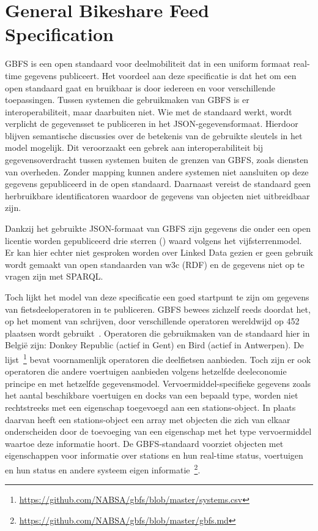 \section{General Bikeshare Feed Specification}
\label{sec:GBFS}
GBFS is een open standaard voor deelmobiliteit dat in een uniform formaat real-time gegevens publiceert. Het voordeel aan deze specificatie is dat het om een open standaard gaat en bruikbaar is door iedereen en voor verschillende toepassingen. Tussen systemen die gebruikmaken van GBFS is er interoperabiliteit, maar daarbuiten niet. Wie met de standaard werkt, wordt verplicht de gegevensset te publiceren in het JSON-gegevensformaat. Hierdoor blijven semantische discussies over de betekenis van de gebruikte sleutels in het model mogelijk. Dit veroorzaakt een gebrek aan interoperabiliteit bij gegevensoverdracht tussen systemen buiten de grenzen van GBFS, zoals diensten van overheden. Zonder mapping kunnen andere systemen niet aansluiten op deze gegevens gepubliceerd in de open standaard. Daarnaast vereist de standaard geen herbruikbare identificatoren waardoor de gegevens van objecten niet uitbreidbaar zijn. 

Dankzij het gebruikte JSON-formaat van GBFS zijn gegevens die onder een open licentie worden gepubliceerd drie sterren  (\ast \ast \ast) waard volgens het vijfsterrenmodel.
Er kan hier echter niet gesproken worden over Linked Data gezien
er geen gebruik wordt gemaakt van open standaarden van w3c (RDF) en de gegevens niet op te vragen zijn met SPARQL. 

Toch lijkt het model van deze specificatie een goed startpunt te zijn om gegevens van fietsdeeloperatoren in te publiceren. GBFS bewees zichzelf reeds doordat het, op het moment van schrijven,  door verschillende operatoren wereldwijd op 452 plaatsen wordt gebruikt~\cite{GBFS_systems}. Operatoren die gebruikmaken van de standaard hier in België zijn: Donkey Republic (actief in Gent) en Bird (actief in Antwerpen). De lijst~\footnote{\url{https://github.com/NABSA/gbfs/blob/master/systems.csv}} bevat voornamenlijk operatoren die deelfietsen aanbieden. Toch zijn er ook operatoren die andere voertuigen aanbieden volgens hetzelfde \gls{deeleconomie} principe en met hetzelfde gegevensmodel. Vervoermiddel-specifieke gegevens zoals het aantal beschikbare voertuigen en docks van een bepaald type, worden niet rechtstreeks met een eigenschap toegevoegd aan een stations-object. In plaats daarvan heeft een stations-object een array met objecten die zich van elkaar onderscheiden door de toevoeging van een eigenschap met het type vervoermiddel waartoe deze informatie hoort.
De GBFS-standaard voorziet objecten met eigenschappen voor informatie over stations en hun real-time status, voertuigen en hun status en andere systeem eigen informatie~\footnote{\url{https://github.com/NABSA/gbfs/blob/master/gbfs.md}}.

